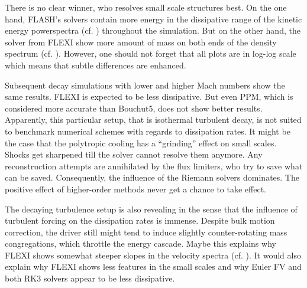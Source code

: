 There is no clear winner, who resolves small scale structures best.  On the one
hand, FLASH's solvers contain more energy in the dissipative range of the
kinetic energy powerspectra (cf. )
throughout the simulation. But on the other hand, the solver from FLEXI show
more amount of mass on both ends of the density spectrum (cf.
). However, one should not forget that all
plots are in log-log scale which means that subtle differences are enhanced.

Subsequent decay simulations with lower and higher Mach numbers show the same
results. FLEXI is expected to be less dissipative. But even PPM, which is
considered more accurate than Bouchut5, does not show better results.
Apparently, this particular setup, that is isothermal turbulent decay, is not
suited to benchmark numerical schemes with regards to dissipation rates. It
might be the case that the polytropic cooling has a ``grinding'' effect on
small scales.  Shocks get sharpened till the solver cannot resolve them anymore.
Any reconstruction attempts are annihilated by the flux limiters, who try to
save what can be saved. Consequently, the influence of the Riemann solvers
dominates. The positive effect of higher-order methods never get a chance to
take effect.

The decaying turbulence setup is also revealing in the sense that the influence
of turbulent forcing on the dissipation rates is immense. Despite bulk motion
correction, the driver still might tend to induce slightly counter-rotating
mass congregations, which throttle the energy cascade. Maybe this explains why
FLEXI shows somewhat steeper slopes in the velocity spectra (cf.
). It would also explain why FLEXI shows less features in the
small scales and why Euler FV and both RK3 solvers appear to be less
dissipative.
